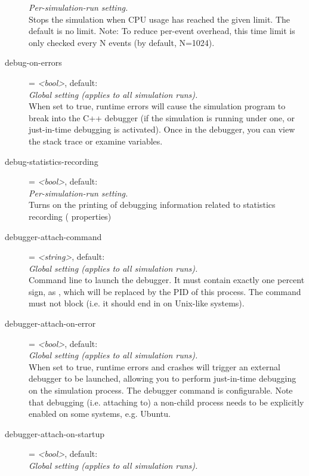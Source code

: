 \begin{description}
    \textit{Per-simulation-run setting.}\\
    Stops the simulation when CPU usage has reached the given limit. The
    default is no limit. Note: To reduce per-event overhead, this time limit is
    only checked every N events (by default, N=1024).
\item[debug-on-errors] = \textit{<bool>}, default: \\
    \textit{Global setting (applies to all simulation runs).}\\
    When set to true, runtime errors will cause the simulation program to break
    into the C++ debugger (if the simulation is running under one, or
    just-in-time debugging is activated). Once in the debugger, you can view
    the stack trace or examine variables.
\item[debug-statistics-recording] = \textit{<bool>}, default: \\
    \textit{Per-simulation-run setting.}\\
    Turns on the printing of debugging information related to statistics
    recording ( properties)
\item[debugger-attach-command] = \textit{<string>}, default: \\
    \textit{Global setting (applies to all simulation runs).}\\
    Command line to launch the debugger. It must contain exactly one percent
    sign, as , which will be replaced by the PID of this process. The
    command must not block (i.e. it should end in \ttt{\&} on Unix-like
    systems).
\item[debugger-attach-on-error] = \textit{<bool>}, default: \\
    \textit{Global setting (applies to all simulation runs).}\\
    When set to true, runtime errors and crashes will trigger an external
    debugger to be launched, allowing you to perform just-in-time debugging on
    the simulation process. The debugger command is configurable. Note that
    debugging (i.e. attaching to) a non-child process needs to be explicitly
    enabled on some systems, e.g. Ubuntu.
\item[debugger-attach-on-startup] = \textit{<bool>}, default: \\
    \textit{Global setting (applies to all simulation runs).}\\

\end{description}

